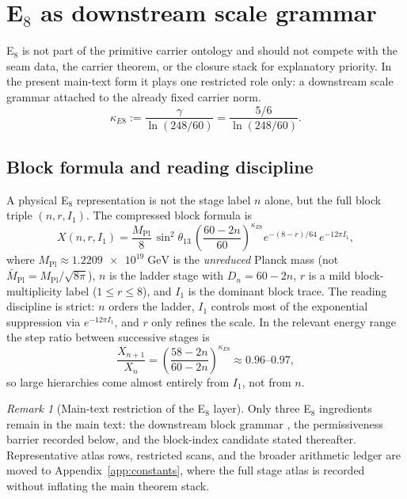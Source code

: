\documentclass[11pt,a4paper]{article}
\theoremstyle{definition}
\theoremstyle{remark}
\newtheorem*{remark}{Remark}
\newcommand{\Mpl}{\bar M_{\mathrm{Pl}}}
\newcommand{\Mplunred}{M_{\mathrm{Pl}}}
\begin{document}
\section{\texorpdfstring{E$_8$}{E8} as downstream scale grammar}

E$_8$ is not part of the primitive carrier ontology and should not compete with the seam data, the carrier theorem, or the closure stack for explanatory priority. In the present main-text form it plays one restricted role only: a downstream scale grammar attached to the already fixed carrier norm.
\[
\kappa_{E8}:=\frac{\gamma}{\ln(248/60)}=\frac{5/6}{\ln(248/60)}.
\]

\subsection{Block formula and reading discipline}

A physical E$_8$ representation is not the stage label $n$ alone, but the full block triple $(n,r,I_1)$. The compressed block formula is
\begin{equation}
\label{eq:e8-block-formula}
X(n,r,I_1)
=
\frac{\Mplunred}{8}\,\sin^2\theta_{13}\,
\left(\frac{60-2n}{60}\right)^{\!\kappa_{E8}}
e^{-(8-r)/64}\,
e^{-12\pi I_1},
\end{equation}
where $\Mplunred\approx\num{1.2209e19}\;\mathrm{GeV}$ is the \emph{unreduced} Planck mass (not $\Mpl=\Mplunred/\sqrt{8\pi}$), $n$ is the ladder stage with $D_n=60-2n$, $r$ is a mild block-multiplicity label ($1\le r\le 8$), and $I_1$ is the dominant block trace. The reading discipline is strict: $n$ orders the ladder, $I_1$ controls most of the exponential suppression via $e^{-12\pi I_1}$, and $r$ only refines the scale. In the relevant energy range the step ratio between successive stages is
\[
\frac{X_{n+1}}{X_n}=\left(\frac{58-2n}{60-2n}\right)^{\!\kappa_{E8}}\approx 0.96\text{--}0.97,
\]
so large hierarchies come almost entirely from $I_1$, not from $n$.
\begin{remark}[Main-text restriction of the E$_8$ layer]
Only three E$_8$ ingredients remain in the main text: the downstream block grammar , the permissiveness barrier recorded below, and the block-index candidate stated thereafter. Representative atlas rows, restricted scans, and the broader arithmetic ledger are moved to Appendix~\ref{app:constants}, where the full stage atlas is recorded without inflating the main theorem stack.
\end{remark}
\end{document}
